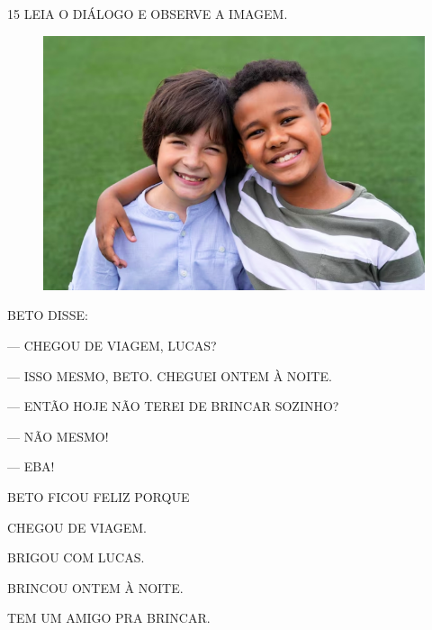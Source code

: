 \num{15} LEIA O DIÁLOGO E OBSERVE A IMAGEM.

\begin{figure}[H]
\centering
\includegraphics[width=\textwidth]{media/image220b.png}
\end{figure}

\begin{myquote}
BETO DISSE:

--- CHEGOU DE VIAGEM, LUCAS?

--- ISSO MESMO, BETO. CHEGUEI ONTEM À NOITE.

--- ENTÃO HOJE NÃO TEREI DE BRINCAR SOZINHO?

--- NÃO MESMO!

--- EBA!
\end{myquote}

BETO FICOU FELIZ PORQUE

\begin{escolha}
\item CHEGOU DE VIAGEM.

\item BRIGOU COM LUCAS.

\item BRINCOU ONTEM À NOITE.

\item TEM UM AMIGO PRA BRINCAR.
\end{escolha}





